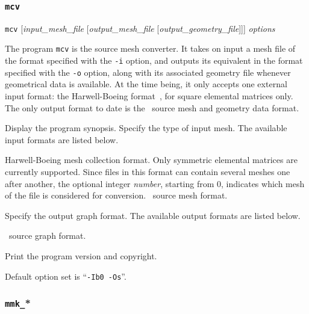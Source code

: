 \subsubsection{\texttt{mcv}}
\label{sec-prog-mcv}

\begin{itemize}
\progsyn
\texttt{mcv} [{\it input\_mesh\_file} [{\it output\_mesh\_file} [{\it output\_geometry\_file}]]] {\it options}

\progdes
The program \texttt{mcv} is the source mesh converter. It takes on input a mesh
file of the format specified with the \texttt{-i} option, and outputs its
equivalent in the format specified with the \texttt{-o} option, along with its
associated geometry file whenever geometrical data is available.
At the time being, it only accepts one external input format: the
Harwell-Boeing format~\cite{dugrle92}, for square elemental matrices only.
The only output format to date is the \scotch\ source mesh and
geometry data format.

\progopt
\begin{itemize}
\iteme[\texttt{-h}]
Display the program synopsis.
Specify the type of input mesh.
The available input formats are listed below.
\begin{itemize}
\iteme[{\texttt{b}[{\it number}]}]
Harwell-Boeing mesh collection format. Only symmetric elemental matrices
are currently supported.
Since files in this format can contain several meshes one after another,
the optional integer {\it number}, starting
from $0$, indicates which mesh of the file is considered for conversion.
\iteme[\texttt{s}]
\scotch\ source mesh format.
\end{itemize}
Specify the output graph format. The available output formats are listed below.
\begin{itemize}
\iteme[\texttt{s}]
\scotch\ source graph format.
\end{itemize}
\iteme[\texttt{-V}]
Print the program version and copyright.
\end{itemize}

Default option set is ``\texttt{-Ib0 -Os}''.
\end{itemize}

\subsubsection{\texttt{mmk\_}*}

